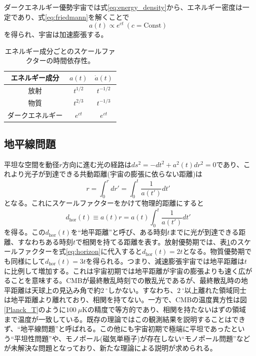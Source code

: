ダークエネルギー優勢宇宙では式\eqref{eq:energy_density}から、エネルギー密度は一定であり、式\eqref{eq:friedmann}を解くことで
\begin{equation}
  a(t) \propto e^{ct} ~ (c = \mathrm{Const})
\end{equation}
を得られ、宇宙は加速膨張する。
\begin{table}[htbp]
  \centering
  \caption{エネルギー成分ごとのスケールファクターの時間依存性。}
  \vspace{3mm}
  \begin{tabular}{ccc} \hline
    エネルギー成分 & $a(t)$ & $\dot{a}(t)$ \\ \hline
    放射 & $t^{1/2}$ & $t^{-1/2}$ \\
    物質 & $t^{2/3}$ & $t^{-1/3}$ \\
    ダークエネルギー & $e^{ct}$ & $e^{ct}$ \\ \hline
  \end{tabular}
  \label{rad_vs_mat}
\end{table}

\subsection{地平線問題}
平坦な空間を動径$r$方向に進む光の経路は$ds^{2} = -dt^{2} + a^{2}(t)dr^{2} = 0$であり、これより光子が到達できる共動距離(宇宙の膨張に依らない距離)は
\begin{equation}
  r = \int_{0}^{r}dr' = \int_{0}^{t}\frac{1}{a(t')}dt'
\end{equation}
となる。これにスケールファクターをかけて物理的距離にすると
\begin{equation}
  d_{\mathrm{hor}}(t)\equiv a(t)r = a(t)\int_{0}^{t}\frac{1}{a(t')}dt' \label{eq:horizon}
\end{equation}
を得る。この$d_{\mathrm{hor}}(t)$を``地平距離''と呼び、ある時刻$t$までに光が到達できる距離、すなわちある時刻$t$で相関を持てる距離を表す。放射優勢期では、表\ref{rad_vs_mat}のスケールファクターを式\eqref{eq:horizon}に代入すると$d_{\mathrm{hor}}(t) = 2t$となる。物質優勢期でも同様にして$d_{\mathrm{hor}}(t) = 3t$を得られる。つまり、減速膨張宇宙では地平距離は$t$に比例して増加する。これは宇宙初期では地平距離が宇宙の膨張よりも速く広がることを意味する。CMBが最終散乱時刻での散乱光であるが、最終散乱時の地平距離は天球上の見込み角で約$\SI{2}{^{\circ}}$しかない。すなわち、$\SI{2}{^{\circ}}$以上離れた領域同士は地平距離より離れており、相関を持てない。一方で、CMBの温度異方性は図\ref{Planck_T}のように$\SI{100}{\mu\mathrm{K}}$の精度で等方的であり、相関を持たないはずの領域まで温度が一致している。既存の理論ではこの観測結果を説明することはできず、``地平線問題''と呼ばれる。この他にも宇宙初期で極端に平坦であったという``平坦性問題''や、モノポール(磁気単極子)が存在しない``モノポール問題''などが未解決な問題となっており、新たな理論による説明が求められる。

